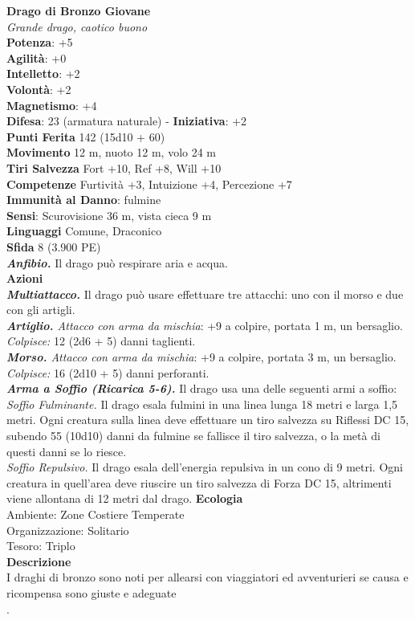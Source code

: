 \begin{multicols}{2}
\medskip\textbf{Drago di Bronzo Giovane}\\
\emph{Grande drago, caotico buono}\\
\textbf{Potenza}: +5\\
\textbf{Agilità}: +0\\
\textbf{Intelletto}: +2\\
\textbf{Volontà}: +2\\
\textbf{Magnetismo}: +4\\
\textbf{Difesa}: 23 (armatura naturale) - \textbf{Iniziativa}: +2\\
\textbf{Punti Ferita} 142 (15d10 + 60)\\
\textbf{Movimento} 12 m, nuoto 12 m, volo 24 m\\
\textbf{Tiri Salvezza} Fort +10, Ref +8, Will +10\\
\textbf{Competenze} Furtività +3, Intuizione +4, Percezione +7\\
\textbf{Immunità al Danno}: fulmine\\
\textbf{Sensi}: Scurovisione 36 m, vista cieca 9 m\\
\textbf{Linguaggi} Comune, Draconico\\
\textbf{Sfida} 8 (3.900 PE)\smallskip\\
\emph{\textbf{Anfibio.}} Il drago può respirare aria e acqua.\\
\smallskip\textbf{Azioni}\\
\emph{\textbf{Multiattacco.}} Il drago può usare effettuare tre attacchi: uno con il morso e due con gli artigli.\\
\emph{\textbf{Artiglio.} Attacco con arma da mischia}: +9 a colpire, portata 1 m, un bersaglio.\\
\emph{Colpisce:} 12 (2d6 + 5) danni taglienti.\\
\emph{\textbf{Morso.} Attacco con arma da mischia}: +9 a colpire, portata 3 m, un bersaglio.\\
\emph{Colpisce:} 16 (2d10 + 5) danni perforanti.\\
\emph{\textbf{Arma a Soffio (Ricarica 5-6).}} Il drago usa una delle seguenti armi a soffio:\\
\emph{Soffio Fulminante.} Il drago esala fulmini in una linea lunga 18 metri e larga 1,5 metri. Ogni creatura sulla linea deve effettuare un tiro salvezza su Riflessi DC 15, subendo 55 (10d10) danni da fulmine se fallisce il tiro salvezza, o la metà di questi danni se lo riesce.\\
\emph{Soffio Repulsivo.} Il drago esala dell'energia repulsiva in un cono di 9 metri. Ogni creatura in quell'area deve riuscire un tiro salvezza di Forza DC 15, altrimenti viene allontana di 12 metri dal drago.
\textbf{Ecologia}\\
Ambiente: Zone Costiere Temperate\\
Organizzazione: Solitario\\
Tesoro: Triplo\\
\textbf{Descrizione}\\
I draghi di bronzo sono noti per allearsi con viaggiatori ed avventurieri se causa e ricompensa sono giuste e adeguate\\
.


\end{multicols}
